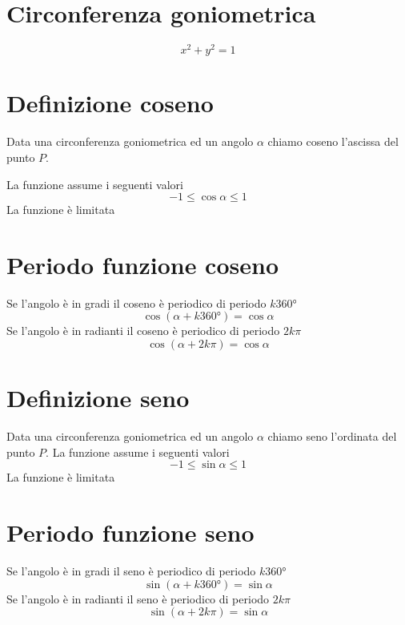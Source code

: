 \section{Circonferenza goniometrica}
\begin{equation*}
x^2+y^2=1
\end{equation*}
\section{Definizione coseno}
Data una circonferenza goniometrica ed un angolo $\alpha$ chiamo coseno l'ascissa del punto $P$.
{\centering
	
	\par}
La funzione assume i seguenti valori
\begin{equation*}
-1\leq \cos\alpha \leq 1
\end{equation*}
La funzione è limitata
\section{Periodo funzione coseno}
Se l'angolo è in gradi il coseno è periodico di periodo $k\ang{360}$
\begin{equation*}
\cos(\alpha+k\ang{360;;})=\cos\alpha
\end{equation*}
Se l'angolo è in radianti il coseno è periodico di periodo $2k\pi$
\begin{equation*}
\cos(\alpha+2k\pi)=\cos\alpha
\end{equation*}
\section{Definizione seno}
Data una circonferenza goniometrica ed un angolo $\alpha$ chiamo seno l'ordinata del punto $P$. La funzione assume i seguenti valori
\begin{equation*}
-1\leq \sin\alpha \leq 1
\end{equation*}
La funzione è limitata
{\centering
	
	\par}
\section{Periodo funzione seno}
Se l'angolo è in gradi il seno è periodico di periodo $k\ang{360}$
\begin{equation*}
\sin(\alpha+k\ang{360;;})=\sin\alpha
\end{equation*}
Se l'angolo è in radianti il seno è periodico di periodo $2k\pi$
\begin{equation*}
\sin(\alpha+2k\pi)=\sin\alpha
\end{equation*}
